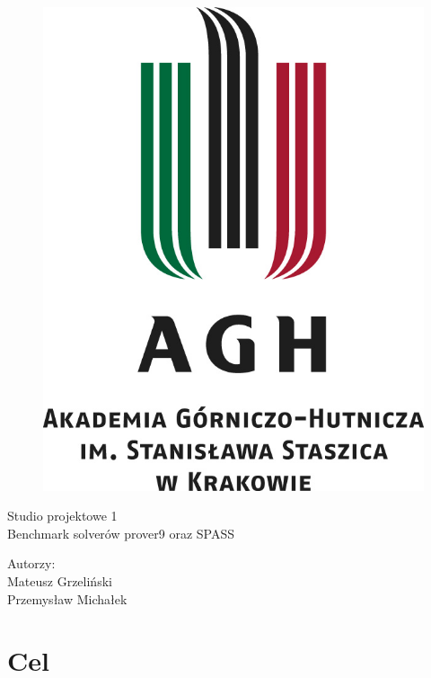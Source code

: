 \documentclass[a4paper,12pt]{article}
\begin{document}
\onehalfspacing

\begin{figure}[!htb]
	\centerline{\includegraphics[scale=0.8]{agh_logo.jpg}}
\end{figure}

\begin{center}
	\Huge{Studio projektowe 1\\}
		\Large{Benchmark solverów prover9 oraz SPASS\\}


	\vspace{5cm}
	\Large{	Autorzy:\\
		Mateusz Grzeliński\\
		Przemysław Michałek\\}

	\newpage

	
\end{center}

\section{Cel}
\end{document}
